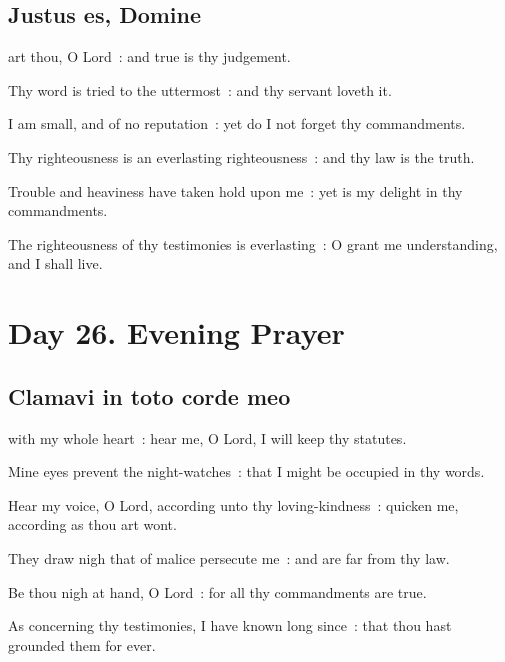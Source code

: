 \clearpage
\subsection{Justus es, Domine}


 art thou, O Lord~: and true is thy judgement.\par
{}
Thy word is tried to the uttermost~: and thy servant loveth it.\par
{}I am small, and of no reputation~: yet do I not forget thy commandments.\par
{}Thy righteousness is an everlasting righteousness~: and thy law is the truth.\par
{}Trouble and heaviness have taken hold upon me~: yet is my delight in thy commandments.\par
{}The righteousness of thy testimonies is everlasting~: O grant me understanding, and I shall live.\par

\section*{Day 26. Evening Prayer}

\subsection{Clamavi in toto corde meo}


 with my whole heart~: hear me, O Lord, I will keep thy statutes.\par
{}
Mine eyes prevent the night-watches~: that I might be occupied in thy words.\par
{}Hear my voice, O Lord, according unto thy loving-kindness~: quicken me, according as thou art wont.\par
{}They draw nigh that of malice persecute me~: and are far from thy law.\par
{}Be thou nigh at hand, O Lord~: for all thy commandments are true.\par
{}As concerning thy testimonies, I have known long since~: that thou hast grounded them for ever.\par

